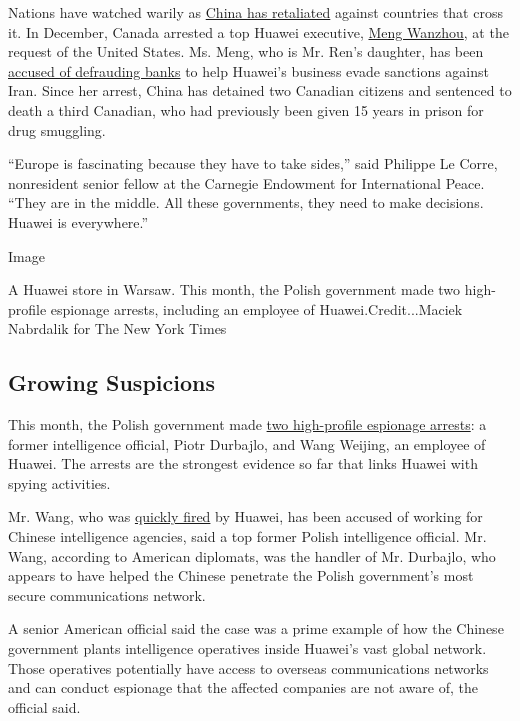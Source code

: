 Nations have watched warily as
\href{https://www.nytimes.com/2019/01/18/world/canada/canada-china-rift.html}{China
has retaliated} against countries that cross it. In December, Canada
arrested a top Huawei executive,
\href{https://www.nytimes.com/2018/12/07/technology/meng-wanzhou-huawei-arrest.html}{Meng
Wanzhou}, at the request of the United States. Ms. Meng, who is Mr.
Ren's daughter, has been
\href{https://www.nytimes.com/2018/12/07/technology/huawei-meng-wanzhou-fraud.html}{accused
of defrauding banks} to help Huawei's business evade sanctions against
Iran. Since her arrest, China has detained two Canadian citizens and
sentenced to death a third Canadian, who had previously been given 15
years in prison for drug smuggling.

``Europe is fascinating because they have to take sides,'' said Philippe
Le Corre, nonresident senior fellow at the Carnegie Endowment for
International Peace. ``They are in the middle. All these governments,
they need to make decisions. Huawei is everywhere.''

Image

A Huawei store in Warsaw. This month, the Polish government made two
high-profile espionage arrests, including an employee of
Huawei.Credit...Maciek Nabrdalik for The New York Times

\hypertarget{growing-suspicions}{%
\subsection{Growing Suspicions}\label{growing-suspicions}}

This month, the Polish government made
\href{https://www.nytimes.com/2019/01/11/world/europe/poland-china-huawei-spy.html}{two
high-profile espionage arrests}: a former intelligence official, Piotr
Durbajlo, and Wang Weijing, an employee of Huawei. The arrests are the
strongest evidence so far that links Huawei with spying activities.

Mr. Wang, who was
\href{https://www.nytimes.com/2019/01/12/world/asia/huawei-wang-weijing-poland.html}{quickly
fired} by Huawei, has been accused of working for Chinese intelligence
agencies, said a top former Polish intelligence official. Mr. Wang,
according to American diplomats, was the handler of Mr. Durbajlo, who
appears to have helped the Chinese penetrate the Polish government's
most secure communications network.

A senior American official said the case was a prime example of how the
Chinese government plants intelligence operatives inside Huawei's vast
global network. Those operatives potentially have access to overseas
communications networks and can conduct espionage that the affected
companies are not aware of, the official said.

